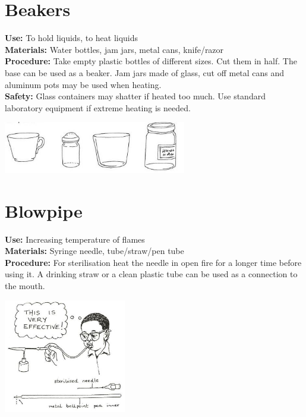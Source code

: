 \begin{multicols}{2}
\section{Beakers}
\label{sec:beakers}
\vspace{-10pt}
\textbf{Use:} To hold liquids, to heat liquids\\
\textbf{Materials:} Water bottles, jam jars, metal cans, knife\slash razor\\
\textbf{Procedure:} Take empty plastic bottles of different sizes. Cut them in half. The base can be used as a beaker. Jam jars made of glass, cut off metal cans and aluminum pots may be used when heating.\\
\textbf{Safety:} Glass containers may shatter if heated too much. Use standard laboratory equipment if extreme heating is needed.
\begin{center}
\includegraphics[width=8cm]{./img/vso/beakers.jpg}
\end{center} 

\section{Blowpipe}
\label{sec:blowpipe}
\vspace{-10pt}
\textbf{Use:} Increasing temperature of flames\\
\textbf{Materials:} Syringe needle, tube/straw/pen tube\\
\textbf{Procedure:} For sterilisation heat the needle
in open fire for a longer time before using it. A
drinking straw or a clean plastic tube can be
used as a connection to the mouth. 
\begin{center}
\includegraphics[width=0.4\textwidth]{./img/source/blowpipe.jpg}
\end{center} 


\end{multicols}
